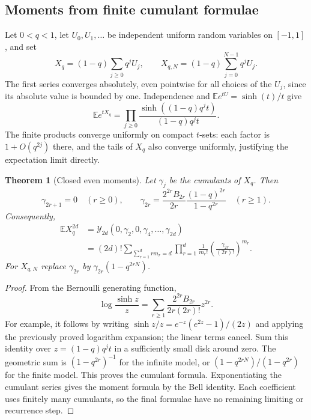 \documentclass[11pt,a4paper]{article}
\numberwithin{equation}{section}
\newtheorem{theorem}{Theorem}[section]
\theoremstyle{definition}
\theoremstyle{remark}
\newcommand{\Y}{\mathcal Y}
\begin{document}
\subsection{Moments from finite cumulant formulae}
Let $0<q<1$, let $U_0,U_1,\ldots$ be independent uniform random variables
on $[-1,1]$, and set
\begin{equation}
 X_q=(1-q)\sum_{j\ge0}q^jU_j,\qquad
 X_{q,N}=(1-q)\sum_{j=0}^{N-1}q^jU_j.
 \label{eq:uniform-model}
\end{equation}
The first series converges absolutely, even pointwise for all choices
of the $U_j$, since its absolute value is bounded by one. Independence
and $\mathbb E e^{tU}=\sinh(t)/t$ give
\begin{equation}
 \mathbb E e^{tX_q}
   =\prod_{j\ge0}\frac{\sinh((1-q)q^jt)}{(1-q)q^jt}.
 \label{eq:uniform-mgf}
\end{equation}
The finite products converge uniformly on compact $t$-sets: each
factor is $1+O(q^{2j})$ there, and the tails of $X_q$ also converge
uniformly, justifying the expectation limit directly.

\begin{theorem}[Closed even moments]
Let $\gamma_j$ be the cumulants of $X_q$. Then
\begin{equation}
 \gamma_{2r+1}=0\quad(r\ge0),\qquad
 \gamma_{2r}=\frac{2^{2r}B_{2r}}{2r}
                \frac{(1-q)^{2r}}{1-q^{2r}}
       \quad(r\ge1).
 \label{eq:uniform-cumulants}
\end{equation}
Consequently,
\begin{align}
 \mathbb E X_q^{2d}
   &=\Y_{2d}(0,\gamma_2,0,\gamma_4,\ldots,\gamma_{2d})
 \label{eq:uniform-moments-bell}\\
   &=(2d)!\sum_{\sum_{r=1}^d r m_r=d}
          \prod_{r=1}^d\frac1{m_r!}
                 \left(\frac{\gamma_{2r}}{(2r)!}\right)^{m_r}.
 \label{eq:uniform-moments-profile}
\end{align}
For $X_{q,N}$ replace $\gamma_{2r}$ by
$\gamma_{2r}(1-q^{2rN})$.
\end{theorem}
\begin{proof}
From the Bernoulli generating function,
\[
 \log\frac{\sinh z}{z}
    =\sum_{r\ge1}\frac{2^{2r}B_{2r}}{2r(2r)!}z^{2r}.
\]
For example, it follows by writing
$\sinh z/z=e^{-z}(e^{2z}-1)/(2z)$ and applying the previously proved
logarithm expansion; the linear terms cancel. Sum this identity over
$z=(1-q)q^jt$ in a sufficiently small disk around zero. The geometric
sum is $(1-q^{2r})^{-1}$ for the infinite model, or
$(1-q^{2rN})/(1-q^{2r})$ for the finite model. This proves the cumulant
formula. Exponentiating the cumulant series gives the moment formula
by the Bell identity. Each coefficient uses finitely many cumulants,
so the final formulae have no remaining limiting or recurrence step.
\end{proof}
\end{document}
